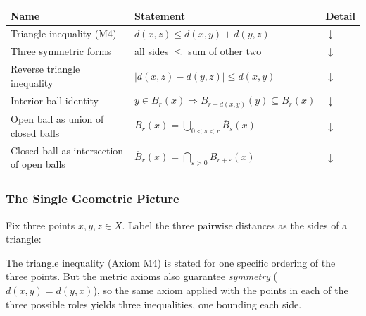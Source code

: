 \begin{tcolorbox}[colback=gray!6, colframe=gray!40, arc=2pt,
  left=6pt, right=6pt, top=4pt, bottom=4pt,
  title={\small\textbf{Triangle Inequality --- Quick Reference}},
  fonttitle=\small\bfseries]
\small
\begin{tabular}{l l l}
\toprule
\textbf{Name} & \textbf{Statement} & \textbf{Detail} \\
\midrule
Triangle inequality (M4)
  & $d(x,z) \le d(x,y)+d(y,z)$
  & \hyperref[prop:triangle-three-forms]{$\downarrow$} \\
Three symmetric forms
  & all sides $\le$ sum of other two
  & \hyperref[prop:triangle-three-forms]{$\downarrow$} \\
Reverse triangle inequality
  & $|d(x,z)-d(y,z)| \le d(x,y)$
  & \hyperref[prop:reverse-triangle]{$\downarrow$} \\
Interior ball identity
  & $y\!\in\!B_r(x)\Rightarrow B_{r-d(x,y)}(y)\!\subseteq\! B_r(x)$
  & \hyperref[rem:interior-ball-identity]{$\downarrow$} \\
Open ball as union of closed balls
  & $B_r(x)=\bigcup_{0<s<r}\overline{B}_s(x)$
  & \hyperref[prop:open-as-union-closed]{$\downarrow$} \\
Closed ball as intersection of open balls
  & $\overline{B}_r(x)=\bigcap_{\varepsilon>0}B_{r+\varepsilon}(x)$
  & \hyperref[prop:closed-as-int-open]{$\downarrow$} \\
\bottomrule
\end{tabular}
\end{tcolorbox}


\subsubsection*{The Single Geometric Picture}

Fix three points $x, y, z \in X$.
Label the three pairwise distances as the sides of a triangle:

\bigskip

\bigskip

\noindent
The triangle inequality (Axiom M4) is stated for one specific ordering
of the three points.
But the metric axioms also guarantee \emph{symmetry} ($d(x,y)=d(y,x)$),
so the same axiom applied with the points in each of the three possible
roles yields three inequalities, one bounding each side.

